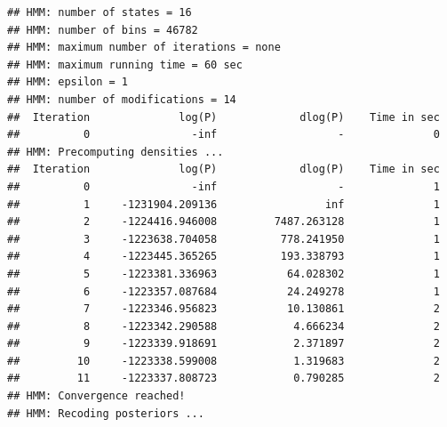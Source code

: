 \documentclass[11pt]{article}\usepackage[]{graphicx}\usepackage[]{color}
\makeatletter
\newenvironment{kframe}{%
 \def\at@end@of@kframe{}%
 \ifinner\ifhmode%
  \def\at@end@of@kframe{\end{minipage}}%
  \begin{minipage}{\columnwidth}%
 \fi\fi%
 \def\FrameCommand##1{\hskip\@totalleftmargin \hskip-\fboxsep
 \colorbox{shadecolor}{##1}\hskip-\fboxsep
     \hskip-\linewidth \hskip-\@totalleftmargin \hskip\columnwidth}%
 \MakeFramed {\advance\hsize-\width
   \@totalleftmargin\z@ \linewidth\hsize
   \@setminipage}}%
 {\par\unskip\endMakeFramed%
 \at@end@of@kframe}
\newenvironment{knitrout}{}{} %
\makeatother
\begin{document}
\begin{scriptsize}
\begin{knitrout}
\begin{kframe}
{\ttfamily\noindent\itshape\color{messagecolor}{\#\# Extracting reads from modellist... 0.02s\\\#\# Getting combinatorial states... 0.08s\\\#\# Computing pre z-matrix... 0.01s\\\#\# Transfering values into z-matrix... 0.09s\\\#\# Computing inverse of correlation matrix... 0.7s\\\#\# \\\#\# Starting multivariate HMM\\\#\# Using the following combinatorial states, covering 75.3879697319482\% of the bins:\\\#\# 15872 0 455 7 511 16320 16327 448 15879 16376 504 16383 15928 56 63 15935}}\begin{verbatim}
## HMM: number of states = 16
## HMM: number of bins = 46782
## HMM: maximum number of iterations = none
## HMM: maximum running time = 60 sec
## HMM: epsilon = 1
## HMM: number of modifications = 14
##  Iteration              log(P)             dlog(P)    Time in sec
##          0                -inf                   -              0
## HMM: Precomputing densities ...
##  Iteration              log(P)             dlog(P)    Time in sec
##          0                -inf                   -              1
##          1     -1231904.209136                 inf              1
##          2     -1224416.946008         7487.263128              1
##          3     -1223638.704058          778.241950              1
##          4     -1223445.365265          193.338793              1
##          5     -1223381.336963           64.028302              1
##          6     -1223357.087684           24.249278              1
##          7     -1223346.956823           10.130861              2
##          8     -1223342.290588            4.666234              2
##          9     -1223339.918691            2.371897              2
##         10     -1223338.599008            1.319683              2
##         11     -1223337.808723            0.790285              2
## HMM: Convergence reached!
## HMM: Recoding posteriors ...
\end{verbatim}



\end{kframe}
\end{knitrout}
\end{scriptsize}
\end{document}
